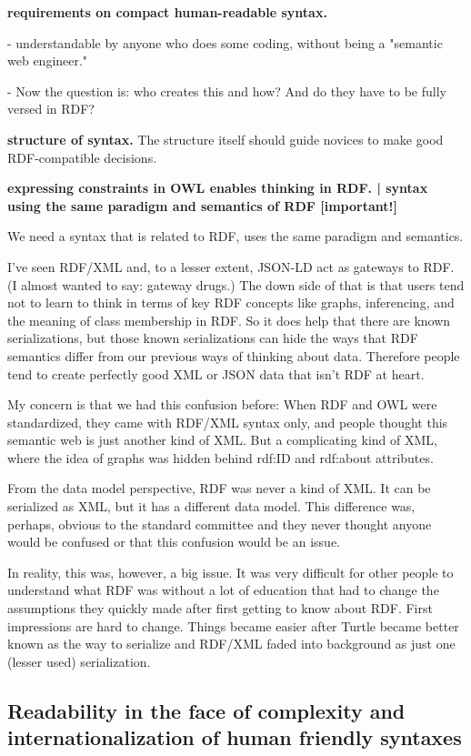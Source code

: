 \documentclass{llncs}
\begin{document}
\textbf{requirements on compact human-readable syntax.}

- understandable by anyone who does some coding, without being a "semantic web engineer." 

- Now the question is: who creates this and how? And do they have to be fully versed in RDF?

\textbf{structure of syntax.}
The structure itself should guide novices to make good RDF-compatible decisions. 

\textbf{expressing constraints in OWL enables thinking in RDF. | syntax using the same paradigm and semantics of RDF [important!]}

We need a syntax that is related to RDF, uses the same paradigm and semantics.

I've seen RDF/XML and, to a lesser extent, JSON-LD act as gateways to 
RDF. (I almost wanted to say: gateway drugs.) The down side of that is 
that users tend not to learn to think in terms of key RDF concepts like 
graphs, inferencing, and the meaning of class membership in RDF. So it 
does help that there are known serializations, but those known 
serializations can hide the ways that RDF semantics differ from our 
previous ways of thinking about data. Therefore people tend to create 
perfectly good XML or JSON data that isn't RDF at heart.

My concern is that we had this confusion before: When RDF and OWL were standardized, they came with RDF/XML syntax only, and people thought this semantic web is just another kind of XML. But a complicating kind of XML, where the idea of graphs was hidden behind rdf:ID and rdf:about attributes.

From the data model perspective, RDF was never a kind of XML. It can be serialized as XML, but it has a different data model. This difference was, perhaps, obvious to the standard committee and they never thought anyone would be confused or that this confusion would be an issue. 

In reality, this was, however,  a big issue. It was very difficult for other people to understand what RDF was without a lot of education that had to change the assumptions they quickly made after first getting to know about RDF. First impressions are hard to change. Things became easier after Turtle became better known as the way to serialize and RDF/XML faded into background as just one (lesser used) serialization.

\subsection{Readability in the face of complexity and internationalization of human friendly syntaxes}
\end{document}
